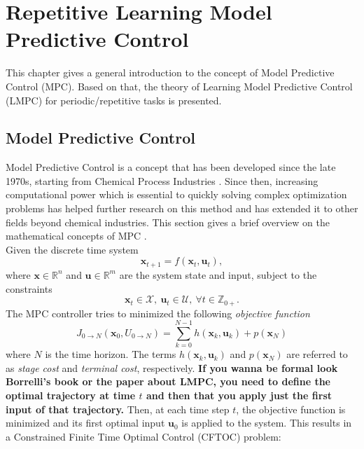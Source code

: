 \chapter{Repetitive Learning Model Predictive Control}
This chapter gives a general introduction to the concept of Model Predictive Control (MPC). Based on that, the theory of Learning Model Predictive Control (LMPC) for periodic/repetitive tasks is presented. %

\section{Model Predictive Control}
Model Predictive Control is a concept that has been developed since the late 1970s, starting from Chemical Process Industries \cite{garcia1989model}. Since then, increasing computational power which is essential to quickly solving complex optimization problems has helped further research on this method and has extended it to other fields beyond chemical industries.
This section gives a brief overview on the mathematical concepts of MPC \cite{Borrelli2003}.\\
Given the discrete time system
\begin{equation}\label{eq:systemDynamics}
\bm{x}_{t+1}=f(\bm{x}_t,\bm{u}_t),
\end{equation}
where $\bm{x}\in \mathbb{R}^n$ and $\bm{u}\in\mathbb{R}^m$ are the system state and input, subject to the constraints
\begin{equation}
\bm{x}_t\in\mathcal{X},\ \bm{u}_t\in\mathcal{U},\ \forall t\in\mathbb{Z}_{0+}.
\end{equation}
The MPC controller tries to minimized the following \emph{objective function} 
\begin{equation}
J_{0\rightarrow N}(\bm{x}_0,U_{0\rightarrow N})=\sum_{k=0}^{N-1}h(\bm{x}_k,\bm{u}_k) + p(\bm{x}_N)
\end{equation}
where $N$ is the time horizon. The terms $h(\bm{x}_k,\bm{u}_k)$ and $p(\bm{x}_N)$ are referred to as \emph{stage cost} and \emph{terminal cost}, respectively. 
{\bfseries{If you wanna be formal look Borrelli's book or the paper about LMPC, you need to define the optimal trajectory at time $t$ and then that you apply just the first input of that trajectory.}}
Then, at each time step $t$, the objective function is minimized and its first optimal input $\bm{u}_0$ is applied to the system. This results in a Constrained Finite Time Optimal Control (CFTOC) problem:
